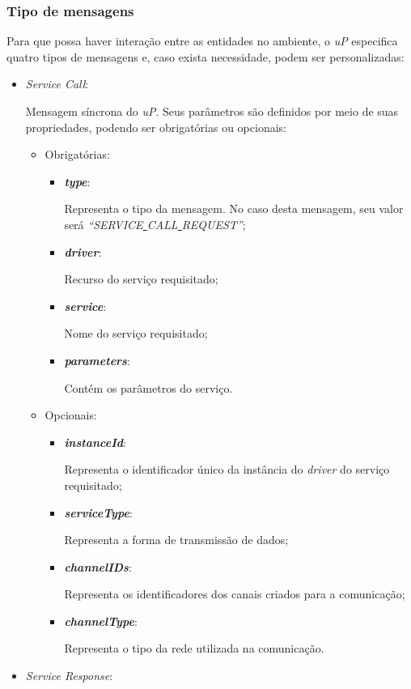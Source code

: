 \subsubsection{Tipo de mensagens}

Para que possa haver interação entre as entidades no ambiente, o \emph{uP} especifica quatro tipos de mensagens e, caso exista necessidade, podem ser personalizadas:

\begin{itemize}
	\item \emph{Service Call}: 

		Mensagem síncrona do \emph{uP}. Seus parâmetros são definidos por meio de suas propriedades, podendo ser obrigatórias ou opcionais:
		\begin{itemize}
			\item Obrigatórias:
				\begin{itemize}
					\item \emph{\bf{type}}: 

						Representa o tipo da mensagem. No caso desta mensagem, seu valor será \emph{``SERVICE\underline{ }CALL\underline{ }REQUEST''};
					\item \emph{\bf{driver}}: 

						Recurso do serviço requisitado;
					\item \emph{\bf{service}}:

						Nome do serviço requisitado;
					\item \emph{\bf{parameters}}:

						Contém os parâmetros do serviço.
				\end{itemize}
			\item Opcionais:
				\begin{itemize}
					\item \emph{\bf{instanceId}}:

						Representa o identificador único da instância do \emph{driver} do serviço requisitado;
					\item \emph{\bf{serviceType}}:
						
						Representa a forma de transmissão de dados;
					\item \emph{\bf{channelIDs}}:

						Representa os identificadores dos canais criados para a comunicação;
					\item \emph{\bf{channelType}}:

						Representa o tipo da rede utilizada na comunicação.
				\end{itemize}
		\end{itemize}
	\item \emph{Service Response}: 


\end{itemize}
